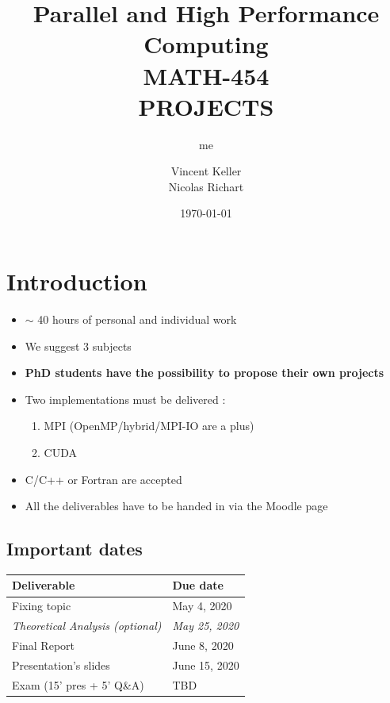 \documentclass[10pt]{article}
\author{ me }%
\date{ \today }%
\begin{document}
\title{\textbf{Parallel and High Performance Computing} \\\textbf{MATH-454}\\\textbf{PROJECTS}}
\author{Vincent Keller \\Nicolas Richart}

\maketitle


\section{Introduction}

\begin{itemize}
	\item{$\sim$ 40 hours of personal and individual work}
	\item{We suggest 3 subjects}
	\item{\textbf{PhD students have the possibility to propose their own projects}}
	\item{Two implementations must be delivered : \begin{enumerate} \item{MPI (OpenMP/hybrid/MPI-IO are a plus)}\item{CUDA}\end{enumerate}}
	\item{C/C++ or Fortran are accepted}
	\item{All the deliverables have to be handed in via the Moodle page}
\end{itemize}


\subsection{Important dates}

\begin{center}
\begin{tabular}{ | l | l |}
\hline
\textbf{Deliverable} & \textbf{Due date} \\
\hline
Fixing topic & May 4, 2020 \\
\hline
\textit{Theoretical Analysis (optional)} & \textit{May 25, 2020} \\
\hline
Final Report & June 8, 2020 \\
\hline
Presentation's slides & June 15, 2020 \\
\hline
Exam (15' pres + 5' Q\&A) &  TBD \\
\hline
\end{tabular}	
\end{center}
\end{document}
